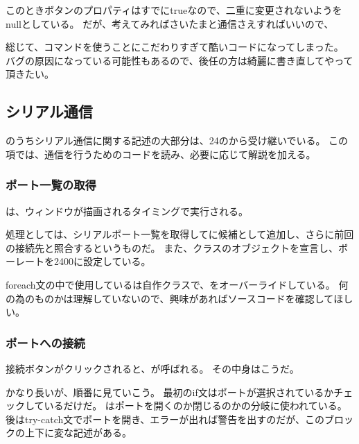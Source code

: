 \documentclass[letterpaper,10pt,dvipdfmx]{sphinxmanual}
\begin{document}
このときボタンのプロパティはすでにtrueなので、二重に変更されないようをnullとしている。
だが、考えてみればさいたまと通信さえすればいいので、

総じて、コマンドを使うことにこだわりすぎて酷いコードになってしまった。
バグの原因になっている可能性もあるので、後任の方は綺麗に書き直してやって頂きたい。


\subsection{シリアル通信}
\label{\detokenize{nissyu-idohen/pc-software-code:id13}}
のうちシリアル通信に関する記述の大部分は、24のから受け継いでいる。
この項では、通信を行うためのコードを読み、必要に応じて解説を加える。


\subsubsection{ポート一覧の取得}
\label{\detokenize{nissyu-idohen/pc-software-code:id14}}
\begin{DUlineblock}{0em}
\item[] は、ウィンドウが描画されるタイミングで実行される。
\item[] 処理としては、シリアルポート一覧を取得してに候補として追加し、さらに前回の接続先と照合するというものだ。
また、クラスのオブジェクトを宣言し、ボーレートを2400に設定している。
\end{DUlineblock}

foreach文の中で使用しているは自作クラスで、をオーバーライドしている。
何の為のものかは理解していないので、興味があればソースコードを確認してほしい。


\subsubsection{ポートへの接続}
\label{\detokenize{nissyu-idohen/pc-software-code:id15}}
接続ボタンがクリックされると、が呼ばれる。
その中身はこうだ。

かなり長いが、順番に見ていこう。
最初のif文はポートが選択されているかチェックしているだけだ。
はポートを開くのか閉じるのかの分岐に使われている。
後はtry-catch文でポートを開き、エラーが出れば警告を出すのだが、このブロックの上下に変な記述がある。
\end{document}
